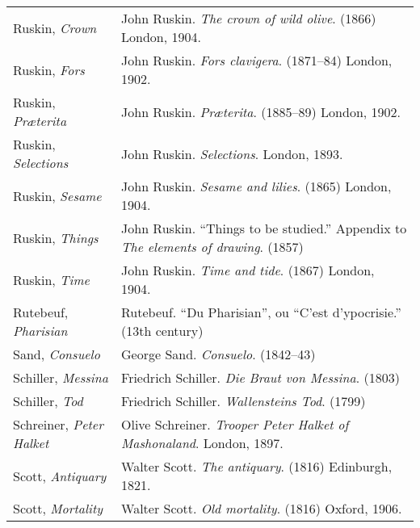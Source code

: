 \begin{longtable}{p{} p{}}
Ruskin, \textit{Crown} & John Ruskin. \textit{The crown of wild olive}. (1866) London, 1904.  \\
Ruskin, \textit{Fors} & John Ruskin. \textit{Fors clavigera}. (1871--84) London, 1902.  \\
Ruskin, \textit{Præterita} & John Ruskin. \textit{Præterita}. (1885--89) London, 1902.  \\
Ruskin, \textit{Selections} & John Ruskin. \textit{Selections}. London, 1893. \\ %
Ruskin, \textit{Sesame} & John Ruskin. \textit{Sesame and lilies}. (1865) London, 1904.  \\
Ruskin, \textit{Things} & John Ruskin. ``Things to be studied.'' Appendix to \textit{The elements of drawing}. (1857) \\
Ruskin, \textit{Time} & John Ruskin. \textit{Time and tide}. (1867) London, 1904.  \\

Rutebeuf, \textit{Pharisian} & Rutebeuf. ``Du Pharisian'', ou ``C'est d'ypocrisie.'' (13th century) \\

Sand, \textit{Consuelo} & George Sand. \textit{Consuelo}. (1842--43) \\

Schiller, \textit{Messina} & Friedrich Schiller. \textit{Die Braut von Messina}. (1803) \\
Schiller, \textit{Tod} & Friedrich Schiller. \textit{Wallensteins Tod}. (1799) \\
%

Schreiner, \textit{Peter Halket} & Olive Schreiner. \textit{Trooper Peter Halket of Mashonaland}. London, 1897. \\
%

Scott, \textit{Antiquary} & Walter Scott. \textit{The antiquary}. (1816) Edinburgh, 1821.  \\
Scott, \textit{Mortality} & Walter Scott. \textit{Old mortality}. (1816) Oxford, 1906. \\ %


\end{longtable}

